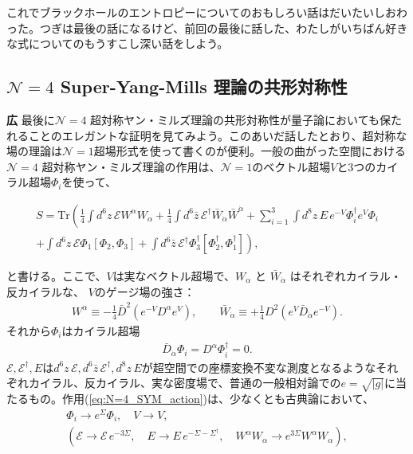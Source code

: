 \documentclass[paper=b5j,fontsize=12Q,jafontsize=12Q,baselineskip=21Q]{jlreq}
\DeclareRobustCommand{\hiron}{\textbf{広 }}
\begin{document}
\begin{refsection}
これでブラックホールのエントロピーについてのおもしろい話はだいたいしおわった。つぎは最後の話になるけど、前回の最後に話した、わたしがいちばん好きな式についてのもうすこし深い話をしよう。

\subsection{$\mathcal N =4$ Super-Yang-Mills 理論の共形対称性}
\hiron 最後に$\mathcal N =4$ 超対称ヤン・ミルズ理論の共形対称性が量子論においても保たれることのエレガントな証明を見てみよう。このあいだ話したとおり、超対称な場の理論は$\mathcal N=1$超場形式を使って書くのが便利。一般の曲がった空間における$\mathcal N =4$ 超対称ヤン・ミルズ理論の作用は、$\mathcal N=1$のベクトル超場$V$と3つのカイラル超場$\Phi_i$を使って、
\begin{tcolorbox}
  \begin{align}
    S=\text{Tr}\left(\frac14\int d^6z\,\mathcal EW^\alpha W_\alpha+\frac14\int d^6\bar z\,\mathcal E^\dagger\bar W_{\dot\alpha}\bar W^{\dot\alpha}+\sum_{i=1}^3\int d^8z\,E\,e^{-V}\Phi_i^\dagger e^V\Phi_i\right.\nonumber\\
\left.+\int d^6z\,\mathcal E\Phi_1[\Phi_2,\Phi_3]+\int d^6\bar z\,\mathcal E^\dagger\Phi_3^\dagger[\Phi_2^\dagger,\Phi_1^\dagger]\right),\label{eq:N=4_SYM_action}
  \end{align}
\end{tcolorbox}
と書ける。ここで、$V$は実なベクトル超場で、$W_\alpha$ と $\bar W_{\dot\alpha}$ はそれぞれカイラル・反カイラルな、 $V$のゲージ場の強さ：
\begin{align}
  W^\alpha\equiv-\frac14\bar D^2\left(e^{-V}D^\alpha e^V\right),\qquad\bar W_{\dot\alpha}\equiv+\frac14D^2\left(e^V\bar D_{\dot\alpha}e^{-V}\right).
\end{align}
それから$\Phi_i$はカイラル超場
\begin{align}
  \bar D_{\dot\alpha}\Phi_i=D^\alpha\Phi_i^\dagger=0.
\end{align}
$\mathcal E,\mathcal E^\dagger, E$は$d^6z\,\mathcal E, d^6\bar z\,\mathcal E^\dagger, d^8z\,E$が超空間での座標変換不変な測度となるようなそれぞれカイラル、反カイラル、実な密度場で、普通の一般相対論での$e=\sqrt{|g|}$に当たるもの。作用(\ref{eq:N=4_SYM_action})は、少なくとも古典論において、
\begin{gather}
  \Phi_i\to e^\Sigma\Phi_i,\quad V\to V,\\
  \left(\mathcal E\to\mathcal E\,e^{-3\Sigma},\quad E\to E\,e^{-\Sigma-\Sigma^\dagger},\quad W^\alpha W_\alpha\to e^{3\Sigma}W^\alpha W_\alpha\right),
\end{gather}


\end{refsection}
\end{document}
